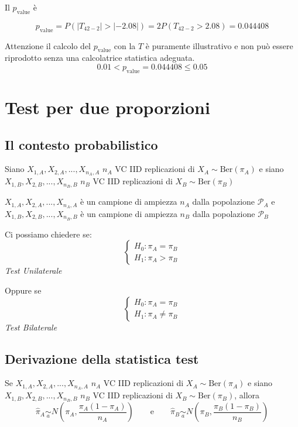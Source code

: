 \documentclass[
  11pt,
]{book}
\theoremstyle{mytheoremstyle}
\theoremstyle{mydefstyle}
\begin{document}
Il \(p_{\text{value}}\) è

\[ p_{\text{value}} = P(|T_{42-2}|>|-2.08|)=2P(T_{42-2}>2.08)=0.044408 \]

Attenzione il calcolo del \(p_\text{value}\) con la \(T\) è puramente illustrativo e non può essere riprodotto senza una calcolatrice statistica adeguata.\[
 0.01 < p_\text{value}= 0.044408 \leq 0.05 
\]

\section{Test per due proporzioni}\label{test-per-due-proporzioni}

\subsection{Il contesto probabilistico}\label{il-contesto-probabilistico-2}

Siano \(X_{1,A},X_{2,A},...,X_{n_A,A}\) \(n_A\) VC IID replicazioni di \(X_A\sim \text{Ber}(\pi_A)\) e siano \(X_{1,B},X_{2,B},...,X_{n_B,B}\) \(n_B\) VC IID replicazioni di \(X_B\sim \text{Ber}(\pi_B)\)

\(X_{1,A},X_{2,A},...,X_{n_A,A}\) è un campione di ampiezza \(n_A\) dalla popolazione \(\mathscr{P}_A\) e \(X_{1,B},X_{2,B},...,X_{n_B,B}\) è un campione di ampiezza \(n_B\) dalla popolazione \(\mathscr{P}_B\)

Ci possiamo chiedere se:
\[\begin{cases}
H_0:\pi_A=\pi_B\\
H_1:\pi_A>\pi_B
\end{cases}\]
\emph{Test Unilaterale}

Oppure se
\[\begin{cases}
H_0:\pi_A=\pi_B\\
H_1:\pi_A\neq\pi_B
\end{cases}\]
\emph{Test Bilaterale}

\subsection{Derivazione della statistica test}\label{derivazione-della-statistica-test-1}

Se \(X_{1,A},X_{2,A},...,X_{n_A,A}\) \(n_A\) VC IID replicazioni di \(X_A\sim \text{Ber}(\pi_A)\) e siano \(X_{1,B},X_{2,B},...,X_{n_B,B}\) \(n_B\) VC IID replicazioni di \(X_B\sim \text{Ber}(\pi_B)\),
allora
\[\hat\pi_A\operatorname*{\sim}_a N\left(\pi_A,\frac {\pi_A(1-\pi_A)}{n_A}\right)\qquad\text{e}\qquad\hat\pi_B\operatorname*{\sim}_a N\left(\pi_B,\frac {\pi_B(1-\pi_B)}{n_B}\right)\]
\end{document}
